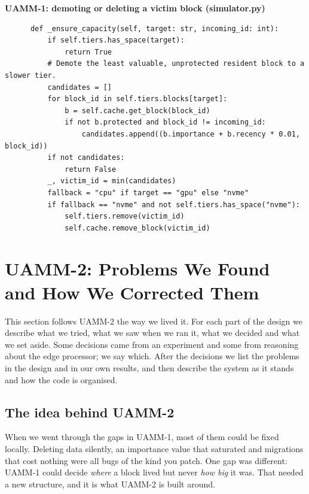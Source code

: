 \documentclass[12pt,a4paper]{report}
\begin{document}
\par\smallskip\noindent\textbf{UAMM-1: demoting or deleting a victim block (simulator.py)}\par\nopagebreak
\begin{lstlisting}
      def _ensure_capacity(self, target: str, incoming_id: int):
          if self.tiers.has_space(target):
              return True
          # Demote the least valuable, unprotected resident block to a slower tier.
          candidates = []
          for block_id in self.tiers.blocks[target]:
              b = self.cache.get_block(block_id)
              if not b.protected and block_id != incoming_id:
                  candidates.append((b.importance + b.recency * 0.01, block_id))
          if not candidates:
              return False
          _, victim_id = min(candidates)
          fallback = "cpu" if target == "gpu" else "nvme"
          if fallback == "nvme" and not self.tiers.has_space("nvme"):
              self.tiers.remove(victim_id)
              self.cache.remove_block(victim_id)
\end{lstlisting}
\chapter{UAMM-2: Problems We Found and How We Corrected Them}
This section follows UAMM-2 the way we lived it. For each part of the design we describe what we tried, what we saw when we ran it, what we decided and what we set aside. Some decisions came from an experiment and some from reasoning about the edge processor; we say which. After the decisions we list the problems in the design and in our own results, and then describe the system as it stands and how the code is organised.

\section{The idea behind UAMM-2}
When we went through the gaps in UAMM-1, most of them could be fixed locally. Deleting data silently, an importance value that saturated and migrations that cost nothing were all bugs of the kind you patch. One gap was different: UAMM-1 could decide \textit{where} a block lived but never \textit{how big} it was. That needed a new structure, and it is what UAMM-2 is built around.
\end{document}
